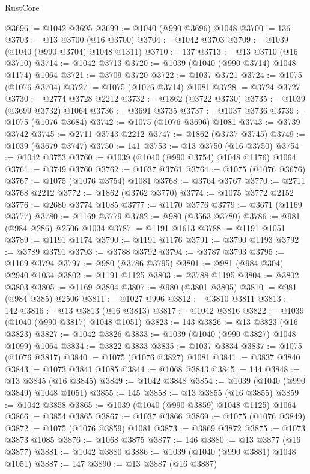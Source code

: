 \begin{lexlean}{RustCore}
\begin{coremodule}
@3696 := @1042 @3695
@3699 := @1040 (@990 @3696) @1048
@3700 := 136
@3703 := @13 @3700 (@16 @3700)
@3704 := @1042 @3703
@3709 := @1039 (@1040 (@990 @3704) @1048 @1311)
@3710 := 137
@3713 := @13 @3710 (@16 @3710)
@3714 := @1042 @3713
@3720 := @1039 (@1040 (@990 @3714) @1048 @1174) @1064
@3721 := @3709 @3720
@3722 := @1037 @3721
@3724 := @1075 (@1076 @3704)
@3727 := @1075 (@1076 @3714) @1081
@3728 := @3724 @3727
@3730 := @2774 @3728 @2212
@3732 := @1862 (@3722 @3730)
@3735 := @1039 (@3699 @3732) @1064
@3736 := @3691 @3735
@3737 := @1037 @3736
@3739 := @1075 (@1076 @3684)
@3742 := @1075 (@1076 @3696) @1081
@3743 := @3739 @3742
@3745 := @2711 @3743 @2212
@3747 := @1862 (@3737 @3745)
@3749 := @1039 (@3679 @3747)
@3750 := 141
@3753 := @13 @3750 (@16 @3750)
@3754 := @1042 @3753
@3760 := @1039 (@1040 (@990 @3754) @1048 @1176) @1064
@3761 := @3749 @3760
@3762 := @1037 @3761
@3764 := @1075 (@1076 @3676)
@3767 := @1075 (@1076 @3754) @1081
@3768 := @3764 @3767
@3770 := @2711 @3768 @2212
@3772 := @1862 (@3762 @3770)
@3774 := @1075 @3772 @2152
@3776 := @2680 @3774 @1085
@3777 := @1170 @3776
@3779 := @3671 (@1169 @3777)
@3780 := @1169 @3779
@3782 := @980 (@3563 @3780)
@3786 := @981 (@984 @286) @2506 @1034
@3787 := @1191 @1613
@3788 := @1191 @1051
@3789 := @1191 @1174
@3790 := @1191 @1176
@3791 := @3790 @1193
@3792 := @3789 @3791
@3793 := @3788 @3792
@3794 := @3787 @3793
@3795 := @1169 @3794
@3797 := @980 (@3786 @3795)
@3801 := @981 (@984 @304) @2940 @1034
@3802 := @1191 @1125
@3803 := @3788 @1195
@3804 := @3802 @3803
@3805 := @1169 @3804
@3807 := @980 (@3801 @3805)
@3810 := @981 (@984 @385) @2506
@3811 := @1027 @996
@3812 := @3810 @3811
@3813 := 142
@3816 := @13 @3813 (@16 @3813)
@3817 := @1042 @3816
@3822 := @1039 (@1040 (@990 @3817) @1048 @1051)
@3823 := 143
@3826 := @13 @3823 (@16 @3823)
@3827 := @1042 @3826
@3833 := @1039 (@1040 (@990 @3827) @1048 @1099) @1064
@3834 := @3822 @3833
@3835 := @1037 @3834
@3837 := @1075 (@1076 @3817)
@3840 := @1075 (@1076 @3827) @1081
@3841 := @3837 @3840
@3843 := @1073 @3841 @1085
@3844 := @1068 @3843
@3845 := 144
@3848 := @13 @3845 (@16 @3845)
@3849 := @1042 @3848
@3854 := @1039 (@1040 (@990 @3849) @1048 @1051)
@3855 := 145
@3858 := @13 @3855 (@16 @3855)
@3859 := @1042 @3858
@3865 := @1039 (@1040 (@990 @3859) @1048 @1125) @1064
@3866 := @3854 @3865
@3867 := @1037 @3866
@3869 := @1075 (@1076 @3849)
@3872 := @1075 (@1076 @3859) @1081
@3873 := @3869 @3872
@3875 := @1073 @3873 @1085
@3876 := @1068 @3875
@3877 := 146
@3880 := @13 @3877 (@16 @3877)
@3881 := @1042 @3880
@3886 := @1039 (@1040 (@990 @3881) @1048 @1051)
@3887 := 147
@3890 := @13 @3887 (@16 @3887)

\end{coremodule}
\end{lexlean}

